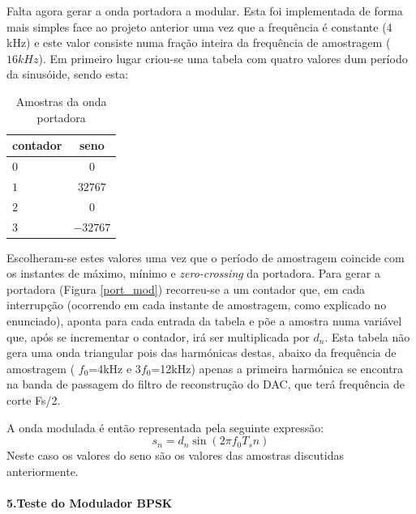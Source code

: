 \documentclass[11pt]{article}
\numberwithin{equation}{section}
\begin{document}
Falta agora gerar a onda portadora a modular. Esta foi implementada de forma mais simples face ao projeto anterior uma vez que a frequência é constante (4 kHz) e este valor consiste numa fração inteira da frequência de amostragem ($16 kHz$).
Em primeiro lugar criou-se uma tabela com quatro valores dum período da sinusóide, sendo esta:
\begin{table}[H]
	\centering
	\caption{Amostras da onda portadora}
	\label{tab:amostras}
	\begin{tabular}[c]{|l||c|}
		\hline \textbf{contador} & \textbf{seno}\\ 
		\hline $ 0 $ & $ 0 $\\ 
		\hline $ 1 $ & $ 32767 $  \\ 
		\hline $ 2 $ & $ 0 $ \\ 
		\hline $ 3 $ & $ -32767 $ \\
		\hline
	\end{tabular}
\end{table}


Escolheram-se estes valores uma vez que o período de amostragem coincide com os instantes de máximo, mínimo e \textit{zero-crossing} da portadora. Para gerar a portadora (Figura \ref{port_mod}) recorreu-se a um contador que, em cada interrupção (ocorrendo em cada instante de amostragem, como explicado no enunciado), aponta para cada entrada da tabela e põe a amostra numa variável que, após se incrementar o contador, irá ser multiplicada por $d_n$. Esta tabela não gera uma onda triangular pois das harmónicas destas, abaixo da frequência de amostragem ( $f_0$=4kHz e 3$f_0$=12kHz) apenas a primeira harmónica se encontra na banda de passagem do filtro de reconstrução do DAC, que terá frequência de corte Fs/2.

A onda modulada é então representada pela seguinte expressão:
\begin{equation}
	s_n= d_n \sin(2 \pi f_0T_sn) 
\end{equation}
Neste caso os valores do seno são os valores das amostras discutidas anteriormente.
\vspace{2 mm}

\paragraph{5.Teste do Modulador BPSK} \hspace{0pt}
\end{document}
